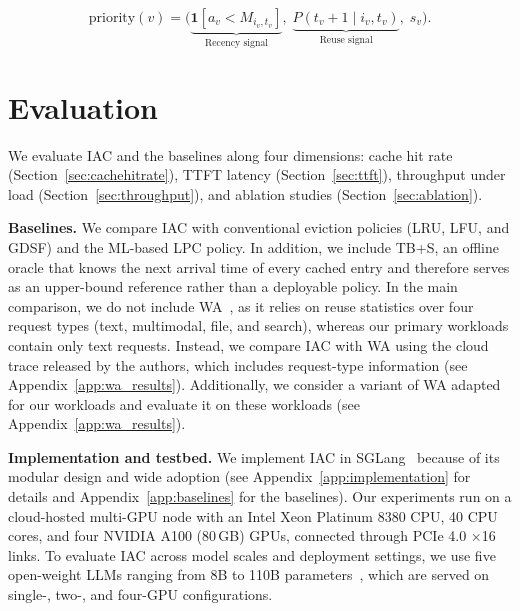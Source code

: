 \documentclass{article}
\newcommand{\jiny}[1]{\textcolor{orange}{[Jiny: #1]}}
\newcommand{\bo}[1]{\textcolor{red}{[Bo: #1]}}
\begin{document}
\vspace{-7pt}

\begin{equation}
\label{eq:iac_score}
\mathrm{priority}(v) =
\bigl(
\underbrace{\mathbf{1}[a_v < M_{i_v,t_v}]}_{\text{Recency signal}},
\;
\underbrace{P(t_v+1 \mid i_v,t_v)}_{\text{Reuse signal}},
\;
s_v
\bigr).
\end{equation}



\section{Evaluation}
\label{sec:evaluation}
\vspace{-7pt}


We evaluate IAC and the baselines along four dimensions: cache hit rate (Section~\ref{sec:cachehitrate}), TTFT latency (Section~\ref{sec:ttft}), throughput under load (Section~\ref{sec:throughput}), and ablation studies (Section~\ref{sec:ablation}).

\textbf{Baselines.}
We compare IAC with conventional eviction policies (LRU, LFU, and GDSF) and the ML-based LPC policy. In addition, we include TB+S, an offline oracle that knows the next arrival time of every cached entry and therefore serves as an upper-bound reference rather than a deployable policy. In the main comparison, we do not include WA~\cite{wang2025kvcache}, as it relies on reuse statistics over four request types (text, multimodal, file, and search), whereas our primary workloads contain only text requests. Instead, we compare IAC with WA using the cloud trace released by the authors, which includes request-type information (see Appendix~\ref{app:wa_results}). Additionally, we consider a variant of WA adapted for our workloads and evaluate it on these workloads (see Appendix~\ref{app:wa_results}).

\textbf{Implementation and testbed.} We implement IAC in SGLang~\cite{sglang_github} because of its modular design and wide adoption (see Appendix~\ref{app:implementation} for details and Appendix~\ref{app:baselines} for the baselines). Our experiments run on a cloud-hosted multi-GPU node with an Intel Xeon Platinum 8380 CPU, 40 CPU cores, and four NVIDIA A100 (80\,GB) GPUs, connected through PCIe 4.0 $\times$16 links. To evaluate IAC across model scales and deployment settings, we use five open-weight LLMs ranging from 8B to 110B parameters~\cite{grattafiori2024llama, yang2025qwen3, qwen2024qwen15}, which are served on single-, two-, and four-GPU configurations.
\end{document}
